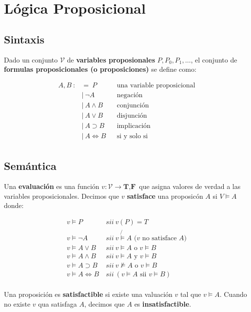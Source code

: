 \section{Lógica Proposicional}
\subsection*{Sintaxis}
Dado un conjunto $\mathcal{V}$ de \textbf{variables proposionales} $P,P_0,P_1,\dots$, el conjunto de \textbf{formulas proposicionales (o proposiciones)} se define como:

\begin{align*}
		A,B ~ :&= ~ P &&\text{una variable proposicional} \\
		& |~ \lnot A &&\text{negación}\\
		& |~ A \land B &&\text{conjunción}\\
		& |~ A \lor B &&\text{disjunción}\\
		& |~ A \supset B &&\text{implicación}\\
		& |~ A \iff B &&\text{si y solo si} \\
\end{align*}


\subsection{Semántica} 

Una \textbf{evaluación} es una función $v:\mathcal{V}\to{\textbf{T},\textbf{F}}$ que asigna valores de verdad a las variables proposicionales. Decimos que $v$ \textbf{satisface} una proposicón $A$ si $V\models A$ donde:

\begin{align*}
v \models P~&sii~v(P) = T\\
v \models \lnot A~&sii~ v \not{\models} A \text{ ($v$ no satisface $A$)}\\
v \models A \lor B~&sii~v \models A \text{ o } v\models B\\
v \models A \land B~&sii~v \models A \text{ y } v\models B\\
v \models A \supset B~&sii~v\not\models A \text{ o } v\models B\\
v \models A \iff B~&sii~(v\models A \text{ sii } v\models B)\\
\end{align*}

Una proposición es \textbf{satisfactible} si existe una valuación $v$ tal que $v\models A$. Cuando no existe $v$ qua satisfaga $A$, decimos que $A$ es \textbf{insatisfactible}.

